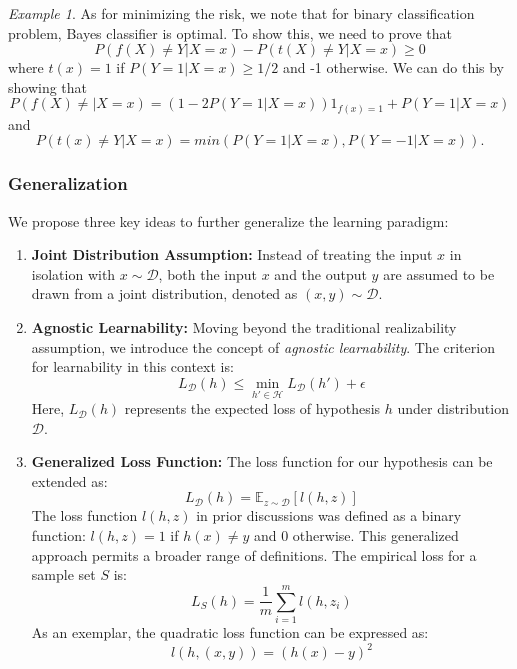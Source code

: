 \documentclass{article}
\theoremstyle{remark}
\newtheorem{example}{Example}
\begin{document}
    \begin{example}
    As for minimizing the risk, we note that for binary classification problem, Bayes classifier is optimal. To show this, we need to prove that $$P(f(X)\neq Y\vert X=x)-P(t(X)\neq Y\vert X=x)\geq 0$$ where $t(x)=1$ if $P(Y=1\vert X=x)\geq 1/2$ and -1 otherwise. We can 
    do this by showing that $$P(f(X)\neq\vert X=x)=(1-2P(Y=1\vert X=x))1_{f(x)=1}+P(Y=1\vert X=x)$$ and $$P(t(x)\neq Y\vert X=x)=min(P(Y=1\vert X=x), P(Y=-1\vert X=x)).$$


    \end{example}
    \subsubsection*{Generalization}

    We propose three key ideas to further generalize the learning paradigm:
    
    \begin{enumerate}
        \item \textbf{Joint Distribution Assumption:} 
        Instead of treating the input \(x\) in isolation with \(x \sim \mathcal{D}\), both the input \(x\) and the output \(y\) are assumed to be drawn from a joint distribution, denoted as \((x,y) \sim \mathcal{D}\).
    
        \item \textbf{Agnostic Learnability:}
        Moving beyond the traditional realizability assumption, we introduce the concept of \textit{agnostic learnability}. The criterion for learnability in this context is:
        \[
        L_\mathcal{D}(h) \leq \min_{h' \in \mathcal{H}} L_\mathcal{D}(h') + \epsilon
        \]
        Here, \(L_\mathcal{D}(h)\) represents the expected loss of hypothesis \(h\) under distribution \(\mathcal{D}\).
    
        \item \textbf{Generalized Loss Function:}
        The loss function for our hypothesis can be extended as:
        \[
        L_\mathcal{D}(h) = \mathbb{E}_{z \sim \mathcal{D}} [l(h, z)]
        \]
        The loss function \(l(h,z)\) in prior discussions was defined as a binary function: \(l(h,z) = 1\) if \(h(x) \neq y\) and \(0\) otherwise. This generalized approach permits a broader range of definitions. The empirical loss for a sample set \(S\) is:
        \[
        L_S(h) = \frac{1}{m} \sum_{i=1}^{m} l(h, z_i)
        \]
        As an exemplar, the quadratic loss function can be expressed as:
        \[
        l(h, (x,y)) = (h(x) - y)^2
        \]
    \end{enumerate}
    
\end{document}
